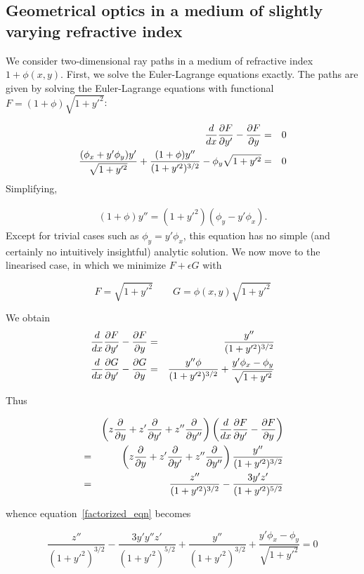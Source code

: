 \documentclass[pdflatex,sn-mathphys-num]{sn-jnl}%
\theoremstyle{thmstyleone}%
\theoremstyle{thmstyletwo}%
\theoremstyle{thmstylethree}%
\begin{document}
\subsection{Geometrical optics in a medium of slightly varying refractive index}

We consider two-dimensional ray paths in a medium of refractive index
$1+\phi(x,y)$.  First, we solve the Euler-Lagrange equations exactly.
The paths are given by solving the Euler-Lagrange equations with
functional $F=(1+\phi)\sqrt{1+y'^2}$:

\begin{eqnarray}
  \frac{d}{dx}\frac{\partial{F}}{\partial{y'}}-\frac{\partial{F}}{\partial{y}} &=& 0\nonumber\\
  \frac{(\phi_x+y'\phi_y)y'}{\sqrt{1+y'^2}}+\frac{(1+\phi)y''}{(1+y'^2)^{3/2}} -
  \phi_y\sqrt{1+y'^2} &=& 0
\end{eqnarray}
%
Simplifying,

\begin{eqnarray}
 (1+\phi) y'' = (1+y'^2)(\phi_y - y'\phi_x).
\end{eqnarray}
%
Except for trivial cases such as $\phi_y=y'\phi_x$, this equation has
no simple (and certainly no intuitively insightful) analytic solution.
We now move to the linearised case, in which we minimize $F+\epsilon G$ with

\begin{equation}F=\sqrt{1+y'^2}\qquad
  G=\phi(x,y)\sqrt{1+y'^2}
\end{equation}

We obtain
\begin{eqnarray}
  \frac{d}{dx}\frac{\partial{F}}{\partial{y'}} - \frac{\partial{F}}{\partial{y}} &=& \frac{y''}{(1+y'^2)^{3/2}}\nonumber\\
  \frac{d}{dx}\frac{\partial{G}}{\partial{y'}} - \frac{\partial{G}}{\partial{y}} &=& \frac{y''\phi}{(1+y'^2)^{3/2}} + \frac{y'\phi_x - \phi_y}{\sqrt{1+y'^2}}
\end{eqnarray}

Thus

\begin{eqnarray}
&{}& \left(z\frac{\partial{}}{\partial{y}} + z'\frac{\partial{}}{\partial{y'}} + z''\frac{\partial{}}{\partial{y''}}\right)\left(\frac{d}{dx}\frac{\partial{F}}{\partial{y'}} - \frac{\partial{F}}{\partial{y}}\right)\nonumber\\
&=&  \left(z\frac{\partial{}}{\partial{y}} + z'\frac{\partial{}}{\partial{y'}} + z''\frac{\partial{}}{\partial{y''}}\right)\frac{y''}{(1+y'^2)^{3/2}}\nonumber\\
&=&  \frac{z''}{(1+y'^2)^{3/2}} - \frac{3y'z'}{(1+y'^2)^{5/2}}
\end{eqnarray}

whence equation~\ref{factorized_eqn} becomes

\begin{equation}
    \frac{z''}{(1+y'^2)^{3/2}}
  - \frac{3y'y''z'}{(1+y'^2)^{5/2}} + 
  \frac{y''}{(1+y'^2)^{3/2}}
  + \frac{y'\phi_x - \phi_y}{\sqrt{1+y'^2}}=0
\end{equation}
\end{document}
